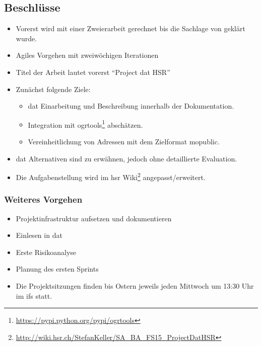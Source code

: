 \documentclass[class=scrbook,crop=false]{standalone}
\begin{document}
	\subsection*{Beschlüsse}
	\begin{itemize}
		\item Vorerst wird mit einer Zweierarbeit gerechnet bis die Sachlage von \chu geklärt wurde.
		\item Agiles Vorgehen mit zweiwöchigen Iterationen
		\item Titel der Arbeit lautet vorerst ``Project dat HSR''
		\item Zunächst folgende Ziele:
		\begin{itemize}
			\item \gls{dat} Einarbeitung und Beschreibung innerhalb der Dokumentation.
			\item Integration mit ogrtools\footnote{\url{https://pypi.python.org/pypi/ogrtools}} abschätzen.
			\item Vereinheitlichung von Adressen mit dem Zielformat \gls{mopublic}.
		\end{itemize}
		\item \gls{dat} Alternativen sind zu erwähnen, jedoch ohne detaillierte Evaluation.
		\item Die Aufgabenstellung wird im \acs{hsr} Wiki\footnote{\url{http://wiki.hsr.ch/StefanKeller/SA_BA_FS15_ProjectDatHSR}} angepasst/erweitert.
	\end{itemize}
	
	\subsubsection*{Weiteres Vorgehen}
	\begin{itemize}
		\item Projektinfrastruktur aufsetzen und dokumentieren
		\item Einlesen in \gls{dat}
		\item Erste Risikoanalyse
		\item Planung des ersten Sprints
		\item Die Projektsitzungen finden bis Ostern jeweils jeden Mittwoch um 13:30 Uhr im \acs{ifs} statt.
	\end{itemize}
	
\end{document}
